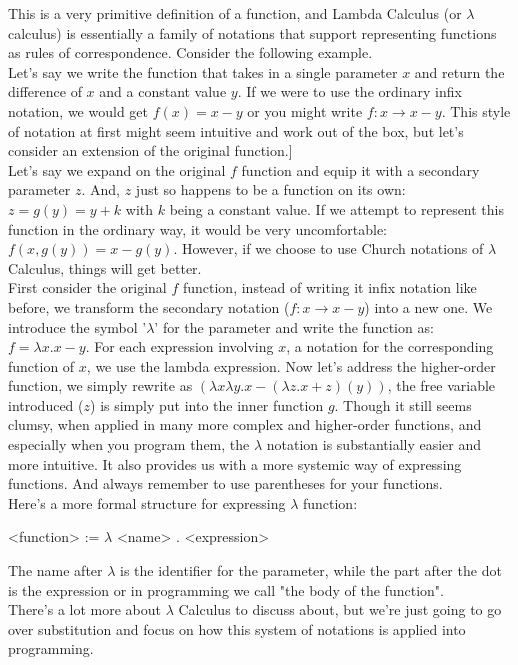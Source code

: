 \documentclass[twoside,final]{hcmut-report}
\begin{document}
This is a very primitive definition of a function, and Lambda Calculus (or $\lambda$ calculus) is essentially a family of notations that support representing functions as rules of correspondence. Consider the following example.\\
\hspace*{3mm} Let's say we write the function that takes in a single parameter $x$ and return the difference of $x$ and a constant value $y$. If we were to use the ordinary infix notation, we would get  $f(x) = x - y$ or you might write $f: x \rightarrow x - y$. This style of notation at first might seem intuitive and work out of the box, but let's consider an extension of the original function.]\\
\hspace*{3mm}Let's say we expand on the original $f$ function and equip it with a secondary parameter $z$. And, $z$ just so happens to be a function on its own: $z = g(y) = y+k$ with $k$ being a constant value. If we attempt to represent this function in the ordinary way, it would be very uncomfortable: $f(x,g(y)) = x - g(y) $. However, if we choose to use Church notations of $\lambda$ Calculus, things will get better.\\
\hspace*{3mm} First consider the original $f$ function, instead of writing it infix notation like before, we transform the secondary notation ($f: x \rightarrow x - y$) into a new one. We introduce the symbol '$\lambda$' for the parameter and write the function as: $f = \lambda x. x - y$. For each expression involving $x$, a notation for the corresponding function of $x$, we use the lambda expression. Now let's address the higher-order function, we simply rewrite as $(\lambda x \lambda y. x - (\lambda z. x + z)(y))$, the free variable introduced ($z$) is simply put into the inner function $g$.  Though it still seems clumsy, when applied in many more complex and higher-order functions, and especially when you program them, the $\lambda$ notation is substantially easier and more intuitive. It also provides us with a more systemic way of expressing functions. And always remember to use parentheses for your functions. \\
\hspace*{3mm} Here's a more formal structure for expressing $\lambda$ function:

\begin{center}

<function> := $\lambda$ <name> . <expression> 
\end{center}
\hspace*{3mm} The name after $\lambda$ is the identifier for the parameter, while the part after the dot is the expression or in programming we call "the body of the function". \\
\hspace*{3mm} There's a lot more about $\lambda$ Calculus to discuss about, but we're just going to go over substitution and focus on how this system of notations is applied into programming.
\end{document}
